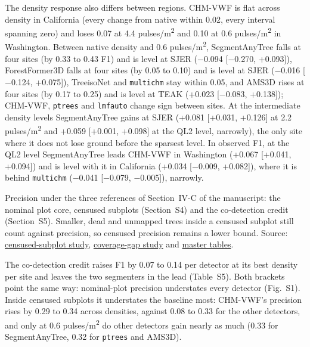 \documentclass[10pt]{article}
\makeatletter
\newcommand\suppFloatBarrier{\par\addpenalty\z@
  \ifx\@deferlist\@empty\else\expandafter\supp@flush\fi}
\newcommand\supp@flush{\let\supp@waiting\@deferlist
  \newpage
  \ifx\@deferlist\supp@waiting\null\newpage\fi
  \ifx\@deferlist\supp@waiting\expandafter\clearpage\else\expandafter\suppFloatBarrier\fi}
\gdef\supp@afterheading{}
\renewcommand\section{\suppFloatBarrier
    \gdef\supp@afterheading{\suppressfloats[t]\gdef\supp@afterheading{}}\supp@section}}
\makeatother
\begin{document}
The density response also differs between regions. CHM-VWF is flat across
density in California (every change from native within 0.02, every interval
spanning zero) and loses 0.07 at 4.4 pulses/m\textsuperscript{2} and 0.10 at 0.6 pulses/m\textsuperscript{2} in
Washington. Between native density and 0.6 pulses/m\textsuperscript{2}, SegmentAnyTree falls at
four sites (by 0.33 to 0.43 F1) and is level at SJER ($-$0.094 [$-$0.270, +0.093]),
ForestFormer3D falls at four sites (by 0.05 to 0.10) and is level at SJER
($-$0.016 [$-$0.124, +0.075]), TreeisoNet and \texttt{multichm} stay within 0.05, and AMS3D
rises at four sites (by 0.17 to 0.25) and is level at TEAK (+0.023 [$-$0.083,
+0.138]); CHM-VWF, \texttt{ptrees} and \texttt{lmfauto} change sign between sites. At the
intermediate density levels SegmentAnyTree gains at SJER (+0.081 [+0.031,
+0.126] at 2.2 pulses/m\textsuperscript{2} and +0.059 [+0.001, +0.098] at the QL2 level,
narrowly), the only site where it does not lose ground before the sparsest
level. In observed F1, at the QL2 level SegmentAnyTree leads CHM-VWF in
Washington (+0.067 [+0.041, +0.094]) and is level with it in California (+0.034
[$-$0.009, +0.082]), where it is behind \texttt{multichm} ($-$0.041 [$-$0.079, $-$0.005]),
narrowly.

\section*{S20. Precision Under Three References}

Precision under the three references of Section~IV-C of the manuscript: the
nominal plot core, censused subplots (Section~S4) and the co-detection credit
(Section~S5). Smaller, dead and unmapped trees inside a censused subplot still
count against precision, so censused precision remains a lower bound. Source:
\href{https://github.com/devakellc/lidar-tree-benchmark/blob/main/results/census-support-results.md}{censused-subplot study}, \href{https://github.com/devakellc/lidar-tree-benchmark/blob/main/results/coverage-gap-results.md}{coverage-gap
study} and \href{https://github.com/devakellc/lidar-tree-benchmark/blob/main/results/master-tables-results.md}{master
tables}.

The co-detection credit raises F1 by 0.07 to 0.14 per detector at its best
density per site and leaves the two segmenters in the lead (Table~S5). Both
brackets point the same way: nominal-plot precision understates every detector
(Fig.~S1). Inside censused subplots it understates the baseline most: CHM-VWF's
precision rises by 0.29 to 0.34 across densities, against 0.08 to 0.33 for the
other detectors, and only at 0.6 pulses/m\textsuperscript{2} do other detectors gain nearly as
much (0.33 for SegmentAnyTree, 0.32 for \texttt{ptrees} and AMS3D).
\end{document}
